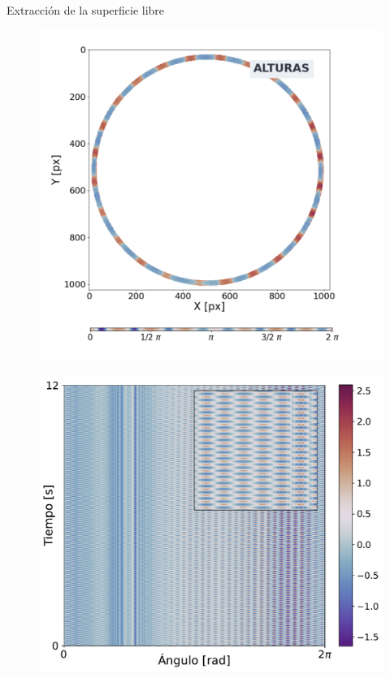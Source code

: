 \documentclass[aspectratio=169]{beamer}
\begin{document}
\begin{frame}{Extracción de la superficie libre} %
	\begin{minipage}{0.49\textwidth}
	  \begin{figure}
	    \includegraphics[width=\linewidth]{figs/annulus_to_strip.png}
	  \end{figure}
	\end{minipage} \hfill
	\begin{minipage}{0.49\textwidth}
	  \begin{figure}
	    \includegraphics[width=\linewidth]{figs/st_med_example.pdf}
	  \end{figure}
	\end{minipage}
\end{frame}
\end{document}
